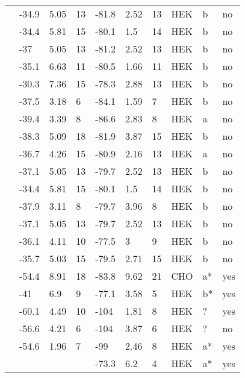 \begin{longtable}{p{5cm}|lll|lll|lll}
\citet{Kapplinger2015MutationDB} & -34.9 & 5.05 & 13 & -81.8 & 2.52 & 13 & HEK & b & no \\
\citet{Kapplinger2015MutationDB} & -34.4 & 5.81 & 15 & -80.1 & 1.5 & 14 & HEK & b & no \\
\citet{Kapplinger2015MutationDB} & -37 & 5.05 & 13 & -81.2 & 2.52 & 13 & HEK & b & no \\
\citet{Kapplinger2015MutationDB} & -35.1 & 6.63 & 11 & -80.5 & 1.66 & 11 & HEK & b & no \\
\citet{Kapplinger2015MutationDB} & -30.3 & 7.36 & 15 & -78.3 & 2.88 & 13 & HEK & b & no \\
\citet{Kapplinger2015MutationDB} & -37.5 & 3.18 & 6 & -84.1 & 1.59 & 7 & HEK & b & no \\
\citet{Kapplinger2015MutationDB} & -39.4 & 3.39 & 8 & -86.6 & 2.83 & 8 & HEK & a & no \\
\citet{Kapplinger2015MutationDB} & -38.3 & 5.09 & 18 & -81.9 & 3.87 & 15 & HEK & b & no \\
\citet{Kapplinger2015MutationDB} & -36.7 & 4.26 & 15 & -80.9 & 2.16 & 13 & HEK & a & no \\
\citet{Kapplinger2015MutationDB} & -37.1 & 5.05 & 13 & -79.7 & 2.52 & 13 & HEK & b & no \\
\citet{Kapplinger2015MutationDB} & -34.4 & 5.81 & 15 & -80.1 & 1.5 & 14 & HEK & b & no \\
\citet{Kapplinger2015MutationDB} & -37.9 & 3.11 & 8 & -79.7 & 3.96 & 8 & HEK & b & no \\
\citet{Kapplinger2015MutationDB} & -37.1 & 5.05 & 13 & -79.7 & 2.52 & 13 & HEK & b & no \\
\citet{Kapplinger2015MutationDB} & -36.1 & 4.11 & 10 & -77.5 & 3 & 9 & HEK & b & no \\
\citet{Kapplinger2015MutationDB} & -35.7 & 5.03 & 15 & -79.5 & 2.71 & 15 & HEK & b & no \\
\citet{Kato2014MutationDB} & -54.4 & 8.91 & 18 & -83.8 & 9.62 & 21 & CHO & a* & yes \\
\citet{Keller2005MutationDB} & -41 & 6.9 & 9 & -77.1 & 3.58 & 5 & HEK & b* & yes \\
\citet{Keller2006MutationDB} & -60.1 & 4.49 & 10 & -104 & 1.81 & 8 & HEK & ? & yes \\
\citet{Li2009MutationDB} & -56.6 & 4.21 & 6 & -104 & 3.87 & 6 & HEK & ? & no \\
\citet{Lin2008MutationDB} & -54.6 & 1.96 & 7 & -99 & 2.46 & 8 & HEK & a* & yes \\
\citet{Liu2002MutationDB} & && & -73.3 & 6.2 & 4 & HEK & a* & yes \\

\end{longtable}
